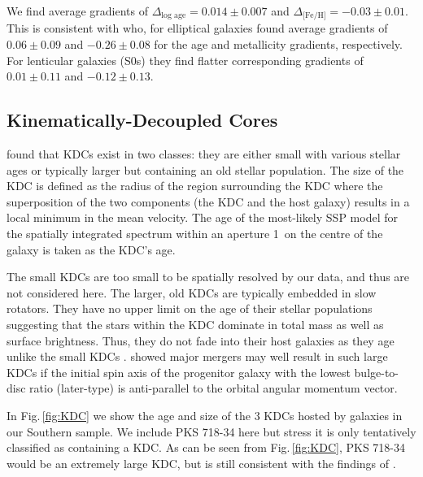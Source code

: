 \documentclass[a4paper,fleqn,usenatbib]{mnras}
\begin{document}
		We find average gradients of $\Delta_\text{log age} = 0.014\pm0.007$ and $\Delta_\text{[Fe/H]} = -0.03\pm0.01$. This is consistent with \citet{Koleva2011} who, for elliptical galaxies found average gradients of $0.06\pm0.09$ and $-0.26\pm0.08$ for the age and metallicity gradients, respectively. For lenticular galaxies (S0s) they find flatter corresponding gradients of $0.01\pm0.11$ and $-0.12\pm0.13$. 

	\subsection{Kinematically-Decoupled Cores}
		\label{subsec:popKDC}
		\citet{Kuntschner2010} found that KDCs exist in two classes: they are either small with various stellar ages or typically larger but containing an old stellar population. The size of the KDC is defined as the radius of the region surrounding the KDC where the superposition of the two components (the KDC and the host galaxy) results in a local minimum in the mean velocity. The age of the most-likely SSP model for the spatially integrated spectrum within an aperture 1\arcsec\ on the centre of the galaxy is taken as the KDC's age.

		The small KDCs are too small to be spatially resolved by our data, and thus are not considered here. The larger, old KDCs are typically embedded in slow rotators. They have no upper limit on the age of their stellar populations suggesting that the stars within the KDC dominate in total mass as well as surface brightness. Thus, they do not fade into their host galaxies as they age unlike the small KDCs \citep{Kuntschner2010}. \citet{Bois2011} showed major mergers may well result in such large KDCs if the initial spin axis of the progenitor galaxy with the lowest bulge-to-disc ratio (later-type) is anti-parallel to the orbital angular momentum vector. 

		In Fig.\,\ref{fig:KDC} we show the age and size of the 3 KDCs hosted by galaxies in our Southern sample. We include PKS 718-34 here but stress it is only tentatively classified as containing a KDC. As can be seen from Fig.\,\ref{fig:KDC}, PKS 718-34 would be an extremely large KDC, but is still consistent with the findings of \citet{Kuntschner2010}.
\end{document}
